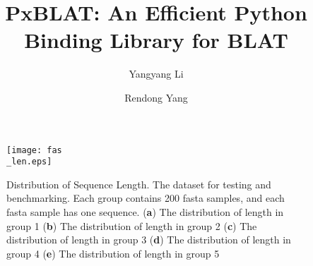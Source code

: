 \documentclass[unnumsec,webpdf,contemporary,large,namedate]{oup-authoring-template-supp}%
\theoremstyle{thmstyleone}%
\theoremstyle{thmstyletwo}%
\theoremstyle{thmstylethree}%
\begin{document}




\title[Efficient Genomics Analysis with \gls{pxblat}]{PxBLAT: An Efficient Python Binding Library for BLAT}

\author[1]{Yangyang Li}
\author[1,2,$\ast$]{Rendong Yang}


\address[1]{, , }
\address[2]{, , }



\abstract{}

\makeatletter
\renewcommand{\thefigure}{S\@arabic\c@figure} %
\renewcommand{\thetable}{S\@arabic\c@table} %
\makeatother
\def\theequation{S\arabic{equation}}

\maketitle

\newpage
\begin{figure}[!ht]
	\centering
	\texttt{[image: fas\\\_len.eps]}
	\caption{Distribution of Sequence Length. The dataset for testing and benchmarking. Each group contains \num{200} fasta samples, and each fasta sample has one sequence.
		(\textbf{a}) The distribution of length in group \num[round-mode=places, round-precision=0]{1}
		(\textbf{b}) The distribution of length in group \num[round-mode=places, round-precision=0]{2}
		(\textbf{c}) The distribution of length in group \num[round-mode=places, round-precision=0]{3}
		(\textbf{d}) The distribution of length in group \num[round-mode=places, round-precision=0]{4}
		(\textbf{e}) The distribution of length in group \num[round-mode=places, round-precision=0]{5}
	}
	\label{suppfig:fas-len}
\end{figure}







% 
% 
\end{document}
